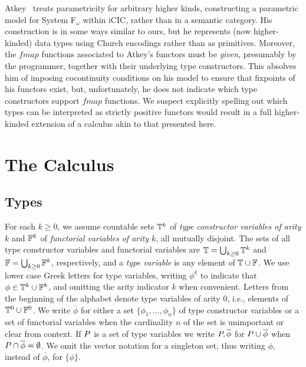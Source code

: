 \documentclass[runningheads]{llncs}
\begin{document}
Atkey~\cite{atk12} treats parametricity for arbitrary higher kinds,
constructing a parametric model for System F$_\omega$ within iCIC,
rather than in a semantic category. His construction is in some ways
similar to ours, but he represents (now higher-kinded) data types
using Church encodings rather than as primitives. Moreover, the
$\mathit{fmap}$ functions associated to Atkey's functors must be {\em
  given}, presumably by the programmer, together with their underlying
type constructors. This absolves him of imposing cocontinuity
conditions on his model to ensure that fixpoints of his functors
exist, but, unfortunately, he does not indicate which type
constructors support $\mathit{fmap}$ functions. We suspect explicitly
spelling out which types can be interpreted as strictly positive
functors would result in a full higher-kinded extension of a calculus
akin to that presented here.

\vspace*{-0.1in}

\section{The Calculus}\label{sec:calculus}

\vspace*{-0.1in}

\subsection{Types}

\vspace*{-0.1in}

For each $k \ge 0$, we assume countable sets $\mathbb{T}^k$ of \emph{type
  constructor variables of arity $k$} and $\mathbb{F}^k$ of
\emph{functorial variables of arity $k$}, all mutually disjoint.
The sets of all type constructor variables and functorial variables
are $\mathbb{T} = \bigcup_{k \ge 0} \mathbb{T}^k$ and $\mathbb{F} = \bigcup_{k \ge
  0} \mathbb{F}^k$, respectively, and a \emph{type variable} is any
element of $\mathbb{T} \cup \mathbb{F}$.  We use lower case Greek letters for
type variables, writing $\phi^k$ to indicate that $\phi \in \mathbb{T}^k
\cup \mathbb{F}^k$, and omitting the arity indicator $k$ when convenient.
Letters from the beginning of the alphabet denote type variables of
arity $0$, i.e., elements of $\mathbb{T}^0 \cup \mathbb{F}^0$. We write
$\overline{\phi}$ for either a set $\{\phi_1,...,\phi_n\}$ of type
constructor variables or a set of functorial variables when the
cardinality $n$ of the set is unimportant or clear from context. If
$P\!\,$ is a set of type variables we write $P\!, \overline{\phi}$
for $P\!\, \cup \overline{\phi}$ when $P\!\, \cap \overline{\phi} =
\emptyset$.  We omit the vector notation for a singleton set, thus
writing $\phi$, instead of $\overline{\phi}$, for $\{\phi\}$.
\end{document}
